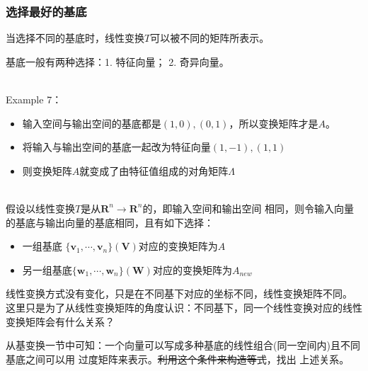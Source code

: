 \subsubsection{选择最好的基底}
当选择不同的基底时，线性变换$T$可以被不同的矩阵所表示。

基底一般有两种选择：1. 特征向量； 2. 奇异向量。

\hspace*{\fill} \\
Example 7：
\begin{itemize}
    \item 输入空间与输出空间的基底都是$(1,0), (0,1)$，所以变换矩阵才是$A$。
    \item 将输入与输出空间的基底一起改为特征向量$(1,-1),(1,1)$
    \item 则变换矩阵$A$就变成了由特征值组成的对角矩阵$\Lambda$
\end{itemize}

\hspace*{\fill} \\
假设以线性变换$T$是从$\boldsymbol{R}^n \rightarrow \boldsymbol{R}^n$的，即输入空间和输出空间
相同，则令输入向量的基底与输出向量的基底相同，且有如下选择：
\begin{itemize}
    \item 一组基底 $\{\boldsymbol{v}_{1},\cdots,\boldsymbol{v}_{n}\}(\boldsymbol{V})$对应的变换矩阵为$A$
    \item 另一组基底$\{\boldsymbol{w}_{1},\cdots,\boldsymbol{w}_{n}\}(\boldsymbol{W})$对应的变换矩阵为$A_{new}$
\end{itemize}

线性变换方式没有变化，只是在不同基下对应的坐标不同，线性变换矩阵不同。
这里只是为了从线性变换矩阵的角度认识：不同基下，同一个线性变换对应的线性变换矩阵会有什么关系？

从基变换一节中可知：一个向量可以写成多种基底的线性组合(同一空间内)且不同基底之间可以用
过度矩阵来表示。\sout{利用这个条件来构造等式}，找出
上述关系。

